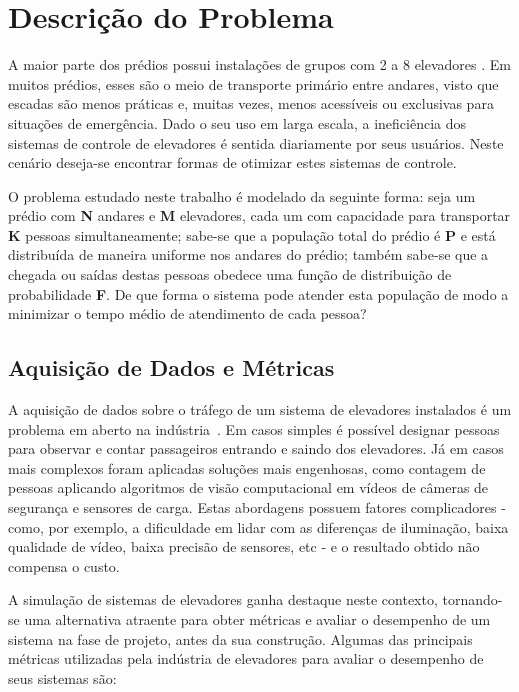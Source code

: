 \chapter{\label{chap:problem}Descrição do Problema}

A maior parte dos prédios possui instalações de grupos com 2 a 8 elevadores \cite{KOEHLEROTTIGER02}. Em muitos prédios, esses são o meio de transporte primário entre andares, visto que escadas são menos práticas e, muitas vezes, menos acessíveis ou exclusivas para situações de emergência. Dado o seu uso em larga escala, a ineficiência dos sistemas de controle de elevadores é sentida diariamente por seus usuários. Neste cenário deseja-se encontrar formas de otimizar estes sistemas de controle.

O problema estudado neste trabalho é modelado da seguinte forma: seja um prédio com \textbf{N} andares e \textbf{M} elevadores, cada um com capacidade para transportar \textbf{K} pessoas simultaneamente; sabe-se que a população total do prédio é \textbf{P} e está distribuída de maneira uniforme nos andares do prédio; também sabe-se que a chegada ou saídas destas pessoas obedece uma função de distribuição de probabilidade \textbf{F}. De que forma o sistema pode atender esta população de modo a minimizar o tempo médio de atendimento de cada pessoa?

\section{Aquisição de Dados e Métricas}

A aquisição de dados sobre o tráfego de um sistema de elevadores instalados é um problema em aberto na indústria~\cite{KOEHLEROTTIGER02}. Em casos simples é possível designar pessoas para observar e contar passageiros entrando e saindo dos elevadores. Já em casos mais complexos foram aplicadas soluções mais engenhosas, como contagem de pessoas aplicando algoritmos de visão computacional em vídeos de câmeras de segurança e sensores de carga. Estas abordagens possuem fatores complicadores - como, por exemplo, a dificuldade em lidar com as diferenças de iluminação, baixa qualidade de vídeo, baixa precisão de sensores, etc - e o resultado obtido não compensa o custo.

A simulação de sistemas de elevadores ganha destaque neste contexto, tornando-se uma alternativa atraente para obter métricas e avaliar o desempenho de um sistema na fase de projeto, antes da sua construção. Algumas das principais métricas utilizadas pela indústria de elevadores para avaliar o desempenho de seus sistemas são:

